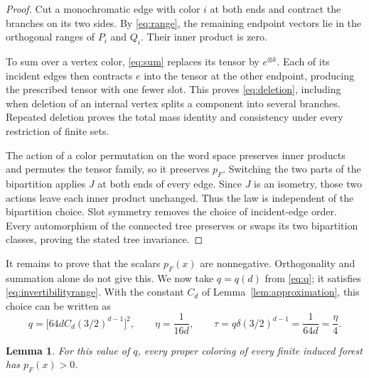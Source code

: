 \documentclass[11pt]{amsart}
\newtheorem{lemma}[theorem]{Lemma}
\begin{document}
\begin{proof}
Cut a monochromatic edge with color $i$ at both ends and contract the branches
on its two sides. By \eqref{eq:range}, the remaining endpoint vectors lie in
the orthogonal ranges of $P_i$ and $Q_i$. Their inner product is zero.

To sum over a vertex color, \eqref{eq:sum} replaces its tensor by
$e^{\otimes k}$. Each of its incident edges then contracts $e$ into the tensor
at the other endpoint, producing the prescribed tensor with one fewer slot.
This proves \eqref{eq:deletion}, including when deletion of an internal vertex
splits a component into several branches. Repeated deletion proves the total
mass identity and consistency under every restriction of finite sets.

The action of a color permutation on the word space preserves inner products
and permutes the tensor family, so it preserves $p_F$. Switching the two
parts of the bipartition applies $J$ at both ends of every edge. Since $J$ is
an isometry, those two actions leave each inner product unchanged. Thus the
law is independent of the bipartition choice. Slot symmetry removes the
choice of incident-edge order. Every automorphism of the connected tree
preserves or swaps its two bipartition classes, proving the stated tree
invariance.
\end{proof}

It remains to prove that the scalars $p_F(x)$ are nonnegative. Orthogonality
and summation alone do not give this. We now take $q=q(d)$ from
\eqref{eq:q}; it satisfies \eqref{eq:invertibilityrange}. With the constant
$C_d$ of Lemma~\ref{lem:approximation}, this choice can be written as
\begin{equation}\label{eq:constants}
q=\bigl[64dC_d(3/2)^{d-1}\bigr]^2,\qquad
\eta=\frac1{16d},\qquad
\tau=q\delta(3/2)^{d-1}=\frac1{64d}=\frac\eta4.
\end{equation}

\begin{lemma}\label{lem:positivity}
For this value of $q$, every proper coloring of every finite induced forest
has $p_F(x)>0$.
\end{lemma}
\end{document}
